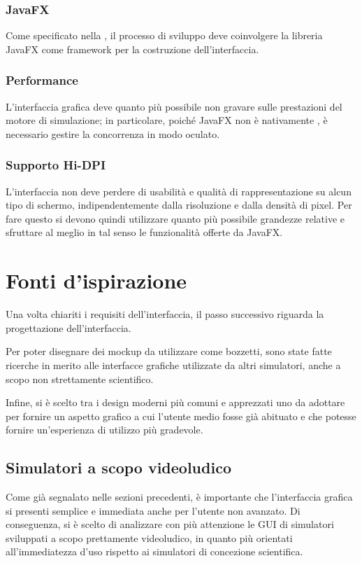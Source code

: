             \subsubsection{JavaFX}\label{subsub:jfx}
                Come specificato nella , il processo di sviluppo deve coinvolgere la libreria JavaFX come framework per la costruzione dell'interfaccia.

            \subsubsection{Performance}\label{subsub:performance}
                L'interfaccia grafica deve quanto più possibile non gravare sulle prestazioni del motore di simulazione; in particolare, poiché JavaFX non è nativamente , è necessario gestire la concorrenza in modo oculato.

            \subsubsection{Supporto Hi-DPI}\label{subsub:hidpi}
                L'interfaccia non deve perdere di usabilità e qualità di rappresentazione su alcun tipo di schermo, indipendentemente dalla risoluzione e dalla densità di pixel. Per fare questo si devono quindi utilizzare quanto più possibile grandezze relative e sfruttare al meglio in tal senso le funzionalità offerte da JavaFX.

    \section{Fonti d'ispirazione}\label{sec:ispirazione}
        Una volta chiariti i requisiti dell'interfaccia, il passo successivo riguarda la progettazione dell'interfaccia.

        Per poter disegnare dei mockup da utilizzare come bozzetti, sono state fatte ricerche in merito alle interfacce grafiche utilizzate da altri simulatori, anche a scopo non strettamente scientifico.

        Infine, si è scelto tra i design moderni più comuni e apprezzati uno da adottare per fornire un aspetto grafico a cui l'utente medio fosse già abituato e che potesse fornire un'esperienza di utilizzo più gradevole.

        \subsection{Simulatori a scopo videoludico}\label{sub:videogame}
            Come già segnalato nelle sezioni precedenti, è importante che l'interfaccia grafica si presenti semplice e immediata anche per l'utente non avanzato. Di conseguenza, si è scelto di analizzare con più attenzione le GUI di simulatori sviluppati a scopo prettamente videoludico, in quanto più orientati all'immediatezza d'uso rispetto ai simulatori di concezione scientifica.

